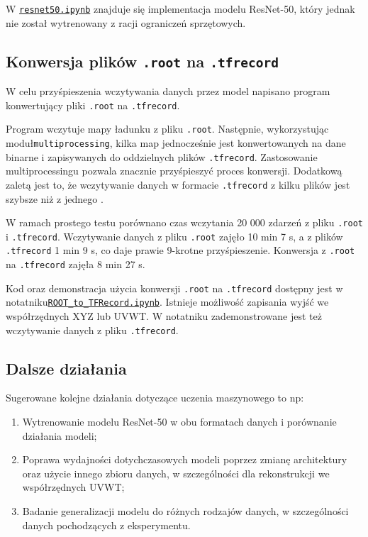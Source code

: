 \documentclass{article}
\begin{document}
W \href{https://github.com/mwbaj/MachineLearning/blob/ZPS_2023_winter/WAWTPC/resnet50.ipynb}{\texttt{resnet50.ipynb}} 
znajduje się implementacja modelu ResNet-50, który jednak nie został wytrenowany z racji ograniczeń sprzętowych.\\

\subsection{Konwersja plików \texttt{.root} na \texttt{.tfrecord}}
W celu przyśpieszenia wczytywania danych przez model napisano program konwertujący pliki \texttt{.root} na \texttt{.tfrecord}.

Program wczytuje mapy ładunku z pliku \texttt{.root}. Następnie, wykorzystując moduł\linebreak \texttt{multiprocessing}, kilka map jednocześnie jest konwertowanych na dane binarne i zapisywanych do oddzielnych plików \texttt{.tfrecord}. Zastosowanie multiprocessingu pozwala znacznie przyśpieszyć proces konwersji. Dodatkową zaletą jest to, że wczytywanie danych w formacie \texttt{.tfrecord} z kilku plików jest szybsze niż z jednego \cite{tfrecord}.

W ramach prostego testu porównano czas wczytania 20 000 zdarzeń z pliku \texttt{.root} i \texttt{.tfrecord}. Wczytywanie danych z pliku \texttt{.root} zajęło 10 min 7 s, a z plików \texttt{.tfrecord} 1 min 9 s, co daje prawie 9-krotne przyśpieszenie. Konwersja z \texttt{.root} na \texttt{.tfrecord} zajęła 8 min 27 s.

Kod oraz demonstracja użycia konwersji \texttt{.root} na \texttt{.tfrecord} dostępny jest w notatniku\linebreak \href{https://github.com/mwbaj/MachineLearning/blob/ZPS_2023_winter/WAWTPC/ROOT_to_TFRecord.ipynb}{\texttt{ROOT\_to\_TFRecord.ipynb}}. Istnieje możliwość zapisania wyjść we współrzędnych XYZ lub UVWT. W notatniku zademonstrowane jest też wczytywanie danych z pliku \texttt{.tfrecord}.

\subsection{Dalsze działania}
Sugerowane kolejne działania dotyczące uczenia maszynowego to np:
\begin{enumerate}
    \item Wytrenowanie modelu ResNet-50 w obu formatach danych i porównanie działania modeli;
    \item Poprawa wydajności dotychczasowych modeli poprzez zmianę architektury oraz użycie innego zbioru danych, w szczególności dla rekonstrukcji we współrzędnych UVWT;
    \item Badanie generalizacji modelu do różnych rodzajów danych, w szczególności danych pochodzących z eksperymentu.
\end{enumerate}
\end{document}
